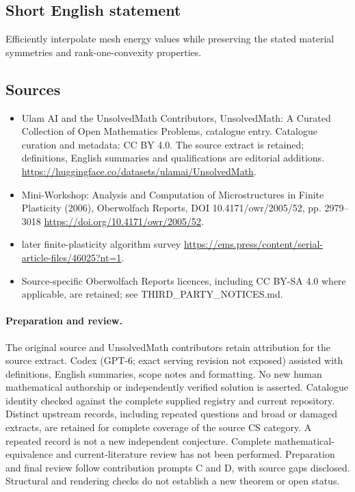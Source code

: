 \documentclass[11pt]{article}
\begin{document}
\subsection{Short English statement}
Efficiently interpolate mesh energy values while preserving the stated material symmetries and rank-one-convexity properties.
\subsection{Sources}
\begin{itemize}
\item[\hypertarget{source:statement:1}{S1}] Ulam AI and the UnsolvedMath Contributors, UnsolvedMath: A Curated Collection of Open Mathematics Problems, catalogue entry. Catalogue curation and metadata: CC BY 4.0. The source extract is retained; definitions, English summaries and qualifications are editorial additions.
\url{https://huggingface.co/datasets/ulamai/UnsolvedMath}.
\item[\hypertarget{source:statement:2}{S2}] Mini-Workshop: Analysis and Computation of Microstructures in Finite Plasticity (2006), Oberwolfach Reports, DOI 10.4171/owr/2005/52, pp. 2979--3018
\url{https://doi.org/10.4171/owr/2005/52}.
\item[\hypertarget{source:statement:3}{S3}] later finite-plasticity algorithm survey
\url{https://ems.press/content/serial-article-files/46025?nt=1}.
\item Source-specific Oberwolfach Reports licences, including CC BY-SA 4.0 where applicable, are retained; see THIRD\_PARTY\_NOTICES.md.
\end{itemize}
\paragraph{Preparation and review.}
The original source and UnsolvedMath contributors retain attribution for the source extract. Codex (GPT-6; exact serving revision not exposed) assisted with definitions, English summaries, scope notes and formatting. No new human mathematical authorship or independently verified solution is asserted. Catalogue identity checked against the complete supplied registry and current repository. Distinct upstream records, including repeated questions and broad or damaged extracts, are retained for complete coverage of the source CS category. A repeated record is not a new independent conjecture. Complete mathematical-equivalence and current-literature review has not been performed. Preparation and final review follow contribution prompts C and D, with source gaps disclosed. Structural and rendering checks do not establish a new theorem or open status.
\label{end:statement}
\end{document}
